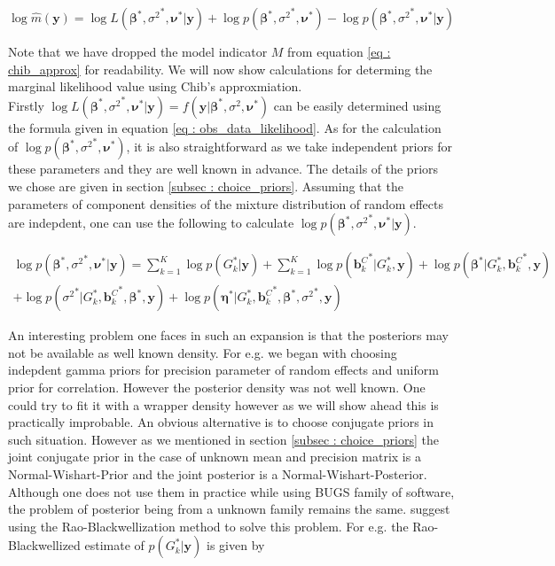 \begin{equation}
\label{eq : chib_approx}
\log{\hat{m}(\boldsymbol{y})} = \log{L({\boldsymbol{\beta}}^*, {\sigma^2}^*, \boldsymbol{\nu}^*|\boldsymbol{y})} + \log{p({\boldsymbol{\beta}}^*, {\sigma^2}^*, \boldsymbol{\nu}^*)} - \log{p({\boldsymbol{\beta}}^*, {\sigma^2}^*, \boldsymbol{\nu}^*|\boldsymbol{y})}
\end{equation}

Note that we have dropped the model indicator $M$ from equation \ref{eq : chib_approx} for readability. We will now show calculations for determing the marginal likelihood value using Chib's approxmiation.\\ 

Firstly $\log{L({\boldsymbol{\beta}}^*, {\sigma^2}^*, \boldsymbol{\nu}^*|\boldsymbol{y})} = f(\boldsymbol{y}|{\boldsymbol{\beta}}^*, \sigma^2, {\boldsymbol{\nu}}^*)$ can be easily determined using the formula given in equation \ref{eq : obs_data_likelihood}. As for the calculation of $\log{p({\boldsymbol{\beta}}^*, {\sigma^2}^*, \boldsymbol{\nu}^*)}$, it is also straightforward as we take independent priors for these parameters and they are well known in advance. The details of the priors we chose are given in section \ref{subsec : choice_priors}. Assuming that the parameters of component densities of the mixture distribution of random effects are indepdent, one can use the following to calculate $\log{p({\boldsymbol{\beta}}^*, {\sigma^2}^*, \boldsymbol{\nu}^*|\boldsymbol{y})}$.

\begin{multline}
\log{p({\boldsymbol{\beta}}^*, {\sigma^2}^*, \boldsymbol{\nu}^*|\boldsymbol{y})} = 
\sum_{k=1}^K{\log{p(G_k^*|\boldsymbol{y})}} + 
\sum_{k=1}^K{\log{p({\boldsymbol{b}_k^C}^*|G_k^*, \boldsymbol{y})}} + 
\log{p({\boldsymbol{\beta}}^*|G_k^*, {\boldsymbol{b}_k^C}^*, \boldsymbol{y})}\\
+ \log{p({\sigma^2}^*|G_k^*, {\boldsymbol{b}_k^C}^*, {\boldsymbol{\beta}}^*, \boldsymbol{y})} + 
\log{p({\boldsymbol{\eta}}^*|G_k^*, {\boldsymbol{b}_k^C}^*, {\boldsymbol{\beta}}^*, {\sigma^2}^*, \boldsymbol{y})}
\end{multline}

An interesting problem one faces in such an expansion is that the posteriors may not be available as well known density. For e.g. we began with choosing indepdent gamma priors for precision parameter of random effects and uniform prior for correlation. However the posterior density was not well known. One could try to fit it with a wrapper density however as we will show ahead this is practically improbable. An obvious alternative is to choose conjugate priors in such situation. However as we mentioned in section \ref{subsec : choice_priors} the joint conjugate prior in the case of unknown mean and precision matrix is a Normal-Wishart-Prior and the joint posterior is a Normal-Wishart-Posterior. Although one does not use them in practice while using BUGS family of software, the problem of posterior being from a unknown family remains the same. \citet{chib_marginal_1995} suggest using the Rao-Blackwellization method to solve this problem. For e.g. the Rao-Blackwellized estimate of $p(G_k^*|\boldsymbol{y})$ is given by


